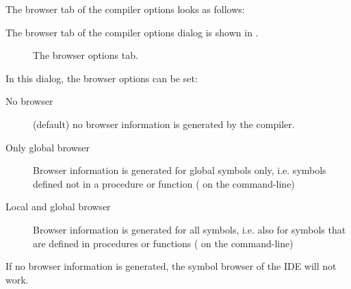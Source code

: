 \begin{htmlonly}
The browser tab of the compiler options looks as follows:
\end{htmlonly}
\begin{latexonly}
The browser tab of the compiler options dialog is shown in
.
\begin{figure}[ht]
\begin{center}
\caption{The browser options tab.}\label{fig:ocompd}
\ifpdf
{}
\else
{}
\fi
\end{center}
\end{figure}
\end{latexonly}
In this dialog, the browser options can be set:
\begin{description}
\item[No browser] (default) no browser information is generated by the
compiler.
\item[Only global browser] Browser information is generated for global
symbols only, i.e. symbols defined not in a procedure or function ( on the command-line)
\item[Local and global browser]  Browser information is generated for all 
symbols, i.e. also for symbols that are defined in procedures or functions 
 ( on the command-line)
\end{description}
\begin{remark}
If no browser information is generated, the symbol browser of the IDE will
not work.
\end{remark}

